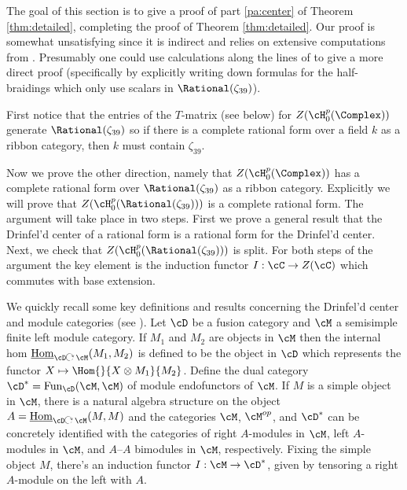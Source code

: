 
\newcommand{\iHom}{\underline{\operatorname{Hom}}}
\newcommand{\actson}{\mathrel{\reflectbox{\rotatebox[origin=c]{90}{$\circlearrowleft $}}}\;}

The goal of this section is to give a proof of part \ref{pa:center} of Theorem \ref{thm:detailed}, completing the proof of Theorem \ref{thm:detailed}.   Our proof is somewhat unsatisfying since it is indirect and relies on extensive computations from \cite{MR1832764}.  Presumably one could use calculations along the lines of \cite{MR1832764} to give a more direct proof (specifically by explicitly writing down formulas for the half-braidings which only use scalars in $\Rational(\zeta_{39})$).


First notice that the entries of the $T$-matrix (see below) for $Z(\cH_0^p(\Complex))$ generate $\Rational(\zeta_{39})$ so if there is a complete rational form over a field $k$ as a ribbon category, then $k$ must contain $\zeta_{39}$.

Now we prove the other direction, namely that $Z(\cH_0^p(\Complex))$ has a complete rational form over $\Rational(\zeta_{39})$ as a ribbon category.  Explicitly we will prove that $Z(\cH_0^p(\Rational(\zeta_{39})))$ is a complete rational form.  The argument will take place in two steps. First we prove a general result that the Drinfel'd center of a rational form is a rational form for the Drinfel'd center. Next, we check that $Z(\cH_0^p(\Rational(\zeta_{39})))$ is split.  For both steps of the argument the key element is the induction functor $I: \cC \rightarrow Z(\cC)$ which commutes with base extension.

We quickly recall some key definitions and results concerning the Drinfel'd center and module categories (see \cite{MR1976459,MR1976233}).  Let $\cD$ be a fusion category and $\cM$ a semisimple finite left module category.  If $M_1$ and $M_2$ are objects in $\cM$ then the internal hom $\iHom_{\cD \actson \cM}(M_1,M_2)$ is defined to be the object in $\cD$ which represents the functor $X \mapsto \Hom{}{X \otimes M_1}{M_2}$.  Define the dual category $\cD^* = \mathrm{Fun}_{\cD}(\cM,\cM)$ of module endofunctors of $\cM$.  If $M$ is a simple object in $\cM$, there is a natural algebra structure on the object $A = \iHom_{\cD \actson \cM}(M,M)$ and the categories $\cM$, $\cM^{op}$, and $\cD^*$ can be concretely identified with the categories of right $A$-modules in $\cM$, left $A$-modules in $\cM$, and $A$--$A$ bimodules in $\cM$, respectively.  Fixing the simple object $M$, there's an induction functor $I: \cM \rightarrow \cD^*$, given by tensoring a right $A$-module on the left with $A$.

